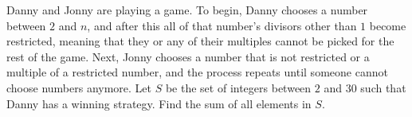 Danny and Jonny are playing a game. To begin, Danny chooses a number between $2$ and $n$, and after this all of that number's divisors other than $1$ become restricted, meaning that they or any of their multiples cannot be picked for the rest of the game. Next, Jonny chooses a number that is not restricted or a multiple of a restricted number, and the process repeats until someone cannot choose numbers anymore. Let $S$ be the set of integers between $2$ and $30$ such that Danny has a winning strategy. Find the sum of all elements in $S$.
